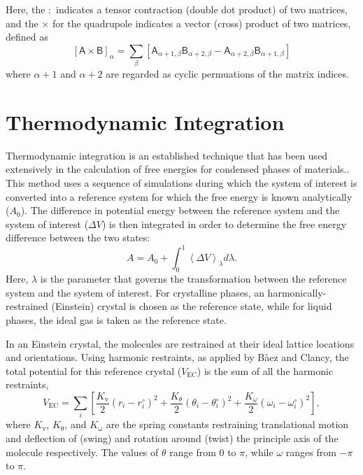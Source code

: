 \documentclass[]{book}
\begin{document}
Here, the $:$ indicates a tensor contraction (double dot product) of
two matrices, and the $\times$ for the quadrupole indicates a vector
(cross) product of two matrices, defined as
\begin{equation}
\left[\mathsf{A} \times \mathsf{B}\right]_\alpha = \sum_\beta
\left[\mathsf{A}_{\alpha+1,\beta} \mathsf{B}_{\alpha+2,\beta}
  -\mathsf{A}_{\alpha+2,\beta} \mathsf{B}_{\alpha+1,\beta} 
\right]
\label{eq:matrixCross}
\end{equation}
where $\alpha+1$ and $\alpha+2$ are regarded as cyclic
permuations of the matrix indices.

\chapter{\label{section:thermInt}Thermodynamic Integration}

Thermodynamic integration is an established technique that has been
used extensively in the calculation of free energies for condensed
phases of
materials.\cite{Frenkel84,Hermens88,Meijer90,Baez95a,Vlot99}.  This
method uses a sequence of simulations during which the system of
interest is converted into a reference system for which the free
energy is known analytically ($A_0$).  The difference in potential
energy between the reference system and the system of interest
($\Delta V$) is then integrated in order to determine the free energy
difference between the two states:
\begin{equation}
 A = A_0 + \int_0^1 \left\langle \Delta V \right\rangle_\lambda
d\lambda.
\label{eq:thermInt}
\end{equation}
Here, $\lambda$ is the parameter that governs the transformation
between the reference system and the system of interest.  For
crystalline phases, an harmonically-restrained (Einstein) crystal is
chosen as the reference state, while for liquid phases, the ideal gas
is taken as the reference state.  

In an Einstein crystal, the molecules are restrained at their ideal
lattice locations and orientations. Using harmonic restraints, as
applied by B\`{a}ez and Clancy, the total potential for this reference
crystal ($V_\mathrm{EC}$) is the sum of all the harmonic restraints,
\begin{equation}
V_\mathrm{EC} = \sum_{i} \left[ \frac{K_\mathrm{v}}{2} (r_i - r_i^\circ)^2 +
\frac{K_\theta}{2} (\theta_i - \theta_i^\circ)^2 +
\frac{K_\omega}{2}(\omega_i - \omega_i^\circ)^2 \right],
\end{equation}
where $K_\mathrm{v}$, $K_\mathrm{\theta}$, and $K_\mathrm{\omega}$ are
the spring constants restraining translational motion and deflection
of (swing) and rotation around (twist) the principle axis of the
molecule respectively.  The values of $\theta$ range from $0$ to
$\pi$, while $\omega$ ranges from $-\pi$ to $\pi$.
\end{document}
